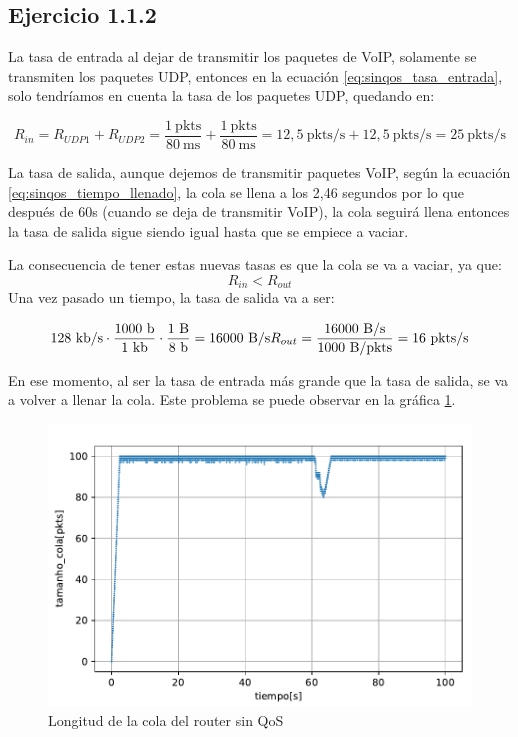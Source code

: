 \subsection{Ejercicio 1.1.2}
La tasa de entrada al dejar de transmitir los paquetes de VoIP, solamente se transmiten los paquetes UDP, entonces en la ecuación \ref{eq:sinqos_tasa_entrada},
solo tendríamos en cuenta la tasa de los paquetes UDP, quedando en:
    
\[
  R_{in} = R_{UDP1} + R_{UDP2} = \frac{1~\mathrm{pkts}}{80~\mathrm{ms}} + \frac{1~\mathrm{pkts}}{80~\mathrm{ms}} = 12,5~\mathrm{pkts/s} + 12,5~\mathrm{pkts/s} = 25~\mathrm{pkts/s}
\]

La tasa de salida, aunque dejemos de transmitir paquetes VoIP, según la ecuación \ref{eq:sinqos_tiempo_llenado}, la cola se llena a los 2,46 segundos
por lo que después de 60s (cuando se deja de transmitir VoIP), la cola seguirá llena entonces la tasa de salida sigue siendo igual hasta que 
se empiece a vaciar.

La consecuencia de tener estas nuevas tasas es que la cola se va a vaciar, ya que: \[R_{in} < R_{out}\]
Una vez pasado un tiempo, la tasa de salida va a ser:

\[
  128~\text{kb/s} \cdot \frac{1000~\text{b}}{1~\text{kb}} \cdot \frac{1~\text{B}}{8~\text{b}} = 16000~\text{B/s} \\
  R_{out} = \frac{16000~\text{B/s}}{1000~\text{B/pkts}} = 16~\text{pkts/s}
\]

En ese momento, al ser la tasa de entrada más grande que la tasa de salida, se va a volver a llenar la cola. Este problema se puede observar
en la gráfica \ref{fig:sinqos_tam}.

\begin{figure}[!ht]
    \centering
    \includegraphics{graficas/sinQoS/tamanho_cola_sinQoS.pdf}
    \caption{Longitud de la cola del router sin QoS}
    \label{fig:sinqos_tam}
\end{figure}

